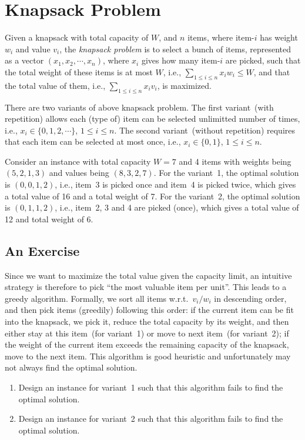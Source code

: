 \setcounter{definition}{0} \setcounter{property}{0} \setcounter{claim}{0} \setcounter{fact}{0} \setcounter{corollary}{0} \setcounter{figure}{0}
\section{Knapsack Problem}

Given a knapsack with total capacity of $W$, and $n$ items, where item-$i$ has weight $w_i$ and value $v_i$,
the \emph{knapsack problem} is to select a bunch of items, represented as a vector $(x_1, x_2, \cdots, x_n)$,
where $x_i$ gives how many item-$i$ are picked, such that
the total weight of these items is at most $W$, i.e., $\sum_{1\le i \le n} x_iw_i \le W$,
and that the total value of them, i.e., $\sum_{1\le i \le n} x_i v_i$, is maximized.

There are two variants of above knapsack problem. 
The first variant~(with repetition) allows each (type of) item can be
selected unlimitted number of times, i.e., $x_i \in \{0, 1, 2, \cdots \}$, $1\le i \le n$.
The second variant~(without repetition) requires that each item can be
selected at most once, i.e., $x_i \in \{0, 1\}$, $1\le i \le n$.

Consider an instance with total capacity $W = 7$ and 4 items with weights being $(5, 2, 1, 3)$
and values being $(8, 3, 2, 7)$. 
For the variant~1, the optimal solution is $(0, 0, 1, 2)$, i.e.,
item~3 is picked once and item~4 is picked twice, which gives a total value of 16 and a total weight of 7.
For the variant~2, the optimal solution is $(0, 1, 1, 2)$, i.e.,
item~2, 3 and 4 are picked (once), which gives a total value of 12 and total weight of 6.

\subsection*{An Exercise}

Since we want to maximize the total value given the capacity limit,
an intuitive strategy is therefore to pick ``the most valuable item per unit''.
This leads to a greedy algorithm. Formally, we sort all items w.r.t.\ $v_i/w_i$ in descending order,
and then pick items (greedily) following this order: if the current item can be fit into the knapsack,
we pick it, reduce the total capacity by its weight, and then either stay at this item~(for variant~1) or move to next item~(for variant~2);
if the weight of the current item exceeds the remaining capacity of the knapsack, move to the next item. 
This algorithm is good heuristic and unfortunately may not always find the optimal solution.
\vspace*{-\topsep}
\begin{enumerate}
\item Design an instance for variant~1 such that this algorithm fails to find the optimal solution.
\item Design an instance for variant~2 such that this algorithm fails to find the optimal solution.
\end{enumerate}

